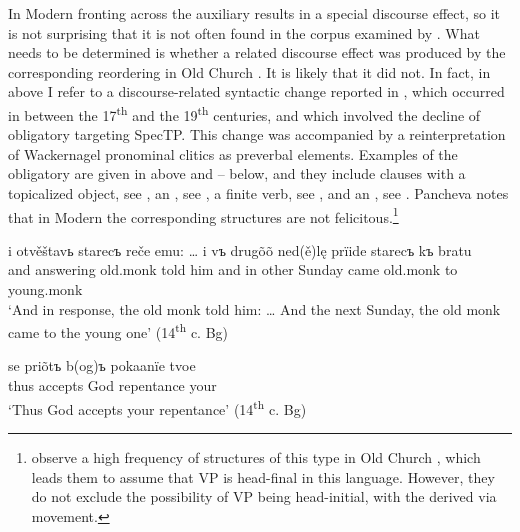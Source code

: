 \documentclass[output=paper,modfonts,newtxmath,hidelinks]{langscibook}
\begin{document}
In Modern   fronting across the  auxiliary results in a special discourse effect, so it is not surprising that it is not often found in the corpus examined by \citeauthor{pancheva2008}. What needs to be determined is whether a related discourse effect was produced by the corresponding  reordering in Old Church . It is likely that it did not. In fact, in  above I refer to a discourse-related syntactic change reported in \citet[153--154]{pancheva2005}, which occurred in  between the 17\textsuperscript{th} and the 19\textsuperscript{th} centuries, and which involved the decline of obligatory  targeting SpecTP. This change was accompanied by a reinterpretation of Wackernagel pronominal clitics as preverbal elements. Examples of the obligatory  are given in  above and -- below, and they include clauses with a topicalized object, see , an  , see , a finite verb, see , and an , see . Pancheva notes that in Modern  the corresponding structures are not felicitous.\footnote{\label{11:fn3}\citet{dimitrovavulchanova-vulchanov2008} observe a high frequency of structures of this type in Old Church , which leads them to assume that VP is head-final in this language. However, they do not exclude the possibility of VP being head-initial, with the  derived via movement.}

\largerpage
\ea \label{11:ex18}
	\gll i otvěštavь starecъ reče emu: {\dots} i vъ drugõõ ned(ě)lę prïide starecъ kъ bratu\\
     and answering old.monk told him {} and in other Sunday came old.monk to young.monk\\
	\glt `And in response, the old monk told him: {\dots} And the next Sunday, the old monk came to the young one' \hfill (14\textsuperscript{th} c. Bg)
\z

\ea \label{11:ex19}
	\gll se priõtъ b(og)ъ pokaanïe tvoe\\
     thus accepts God repentance your \\
	\glt `Thus God accepts your repentance' \hfill (14\textsuperscript{th} c. Bg)
\z
\end{document}

